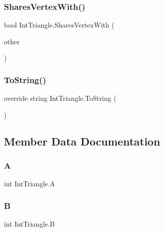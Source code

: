 \subsubsection{\texorpdfstring{Shares\+Vertex\+With()}{SharesVertexWith()}}
{\footnotesize\ttfamily bool Int\+Triangle.\+Shares\+Vertex\+With (\begin{DoxyParamCaption}\item[{\mbox{\hyperlink{struct_int_triangle}{Int\+Triangle}}}]{other }\end{DoxyParamCaption})}

\mbox{\label{struct_int_triangle_ad0cf63439b025aa03ed28495c1fef0e6}} 
\subsubsection{\texorpdfstring{To\+String()}{ToString()}}
{\footnotesize\ttfamily override string Int\+Triangle.\+To\+String (\begin{DoxyParamCaption}{ }\end{DoxyParamCaption})}



\subsection{Member Data Documentation}
\mbox{\label{struct_int_triangle_ac469d79ae7703c1bb7b3620b955da00b}} 
\subsubsection{\texorpdfstring{A}{A}}
{\footnotesize\ttfamily int Int\+Triangle.\+A}

\mbox{\label{struct_int_triangle_a643dc502fac6003f4c76a6c0a983f2dc}} 
\subsubsection{\texorpdfstring{B}{B}}
{\footnotesize\ttfamily int Int\+Triangle.\+B}

\mbox{\label{struct_int_triangle_a703a8799b3d2ed91c6fd444d028efa3a}} 
